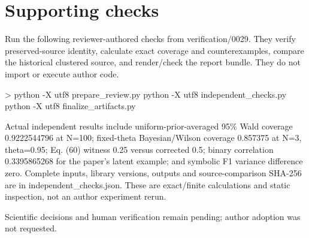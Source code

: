 \documentclass[10pt]{article}
\begin{document}
\section*{Supporting checks}
Run the following reviewer-authored checks from verification/0029. They verify preserved-source identity, calculate exact coverage and counterexamples, compare the historical clustered source, and render/check the report bundle. They do not import or execute author code.\par
> python -X utf8 prepare\_review.py python -X utf8 independent\_checks.py python -X utf8 finalize\_artifacts.py\par
Actual independent results include uniform-prior-averaged 95\% Wald coverage 0.9222544796 at N=100; fixed-theta Bayesian/Wilson coverage 0.857375 at N=3, theta=0.95; Eq. (60) witness 0.25 versus corrected 0.5; binary correlation 0.3395865268 for the paper’s latent example; and symbolic F1 variance difference zero. Complete inputs, library versions, outputs and source-comparison SHA-256 are in independent\_checks.json. These are exact/finite calculations and static inspection, not an author experiment rerun.\par
Scientific decisions and human verification remain pending; author adoption was not requested.\par
\end{document}
